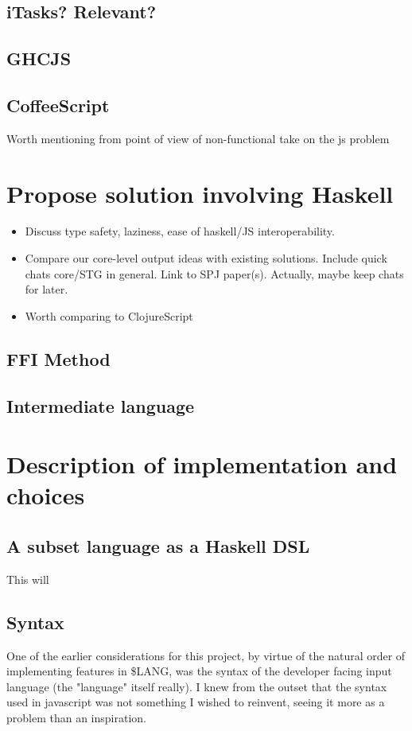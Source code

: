 \documentclass[11pt]{article}
\newcommand{\lang}{\$LANG}
\begin{document}
\subsection{iTasks? Relevant?}

\subsection{GHCJS}

\subsection{CoffeeScript}
Worth mentioning from point of view of non-functional take on the js problem

\section{Propose solution involving Haskell}
\begin{itemize}
\item Discuss type safety, laziness, ease of haskell/JS interoperability.
\item Compare our core-level output ideas with existing solutions. Include quick chats
	  core/STG in general. Link to SPJ paper(s). Actually, maybe keep chats for later.
\item Worth comparing to ClojureScript 
\end{itemize}

\subsection{FFI Method}

\subsection{Intermediate language}

\pagebreak

\section{Description of implementation and choices}

\subsection{A subset language as a Haskell DSL}
This will 

\subsection{Syntax}
One of the earlier considerations for this project, by virtue of the natural order
of implementing features in \lang, was the syntax of the developer facing input 
language (the "language" itself really). I knew from the outset that the syntax
used in javascript was not something I wished to reinvent, seeing it more as a
problem than an inspiration. 
\end{document}
